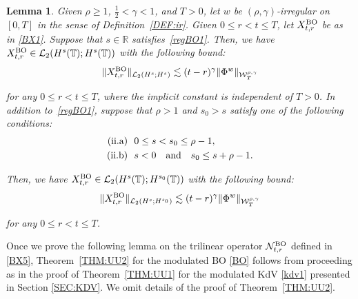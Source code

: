 \documentclass[letterpaper, 11pt,  reqno]{amsart}
\newtheorem{lemma}[theorem]{Lemma}
\newcommand{\1}{\hspace{0.5mm}\text{I}\hspace{0.5mm}}
\newcommand{\noi}{\noindent}
\newcommand{\R}{\mathbb{R}}
\newcommand{\T}{\mathbb{T}}
\renewcommand{\L}{\mathcal{L}}
\newcommand{\g}{\gamma}
\newcommand{\les}{\lesssim}
\newcommand{\NN}{\mathcal{N}}
\newcommand{\W}{\mathcal{W}}
\newcommand{\BO}{\text{\rm BO} }
\numberwithin{equation}{section}
\numberwithin{theorem}{section}
\begin{document}
\begin{lemma}\label{LEM:nonlin3}
Given $\rho \ge 1$,  $\frac12< \g < 1$, and $T> 0$, 
let  $w$ be $(\rho,\g)$-irregular on $[0, T]$ in the sense of Definition~\ref{DEF:ir}.
Given $0 \le r < t \le T$, let $X^\BO_{t, r}$
be as in \eqref{BX1}.
Suppose that $s \in \R$ satisfies~\eqref{regBO1}.
Then, 
we have $X_{t, r}^\BO \in \L_2(H^s(\T); H^{s}(\T))$
with the following bound\textup{:}
\begin{align*}
 \|X^\BO_{t, r}\|_{\L_2(H^s; H^{s})}
\les 
(t-r)^\g  \|\Phi^w\|_{  \W^{\rho,\g}_T}
\end{align*}

\noi
for any $0 \le r < t \le T$, 
where the implicit constant is independent of $T > 0$.
In addition to~\eqref{regBO1}, suppose that 
$\rho  > 1$ and $s_0 > s$ satisfy
one of the following conditions\textup{:}
\begin{align*}
\textup{(ii.a)} &\ \
0 \le s < s_0 \le \rho - 1,\\
\textup{(ii.b)} &\ \
 s <0
\quad 
\text{and}\quad 
s_0 \le s + \rho - 1.
\end{align*}




\noi
Then, 
we have 
$X^\BO_{t, r} \in \L_2(H^s(\T); H^{s_0}(\T))$
with the following bound\textup{:}
\begin{align*}
 \|X^\BO_{t, r}\|_{\L_2(H^s; H^{s_0})}
\les 
(t- r)^\g  \|\Phi^w\|_{  \W^{\rho,\g}_T}
\end{align*}

\noi
for any $0 \le r < t \le T$.



\end{lemma}



Once we prove the following lemma
on the trilinear operator $\NN_{t, r}^\BO$
defined in \eqref{BX5},
Theorem~\ref{THM:UU2} 
for the modulated BO \eqref{BO} follows
from proceeding as in 
the proof of Theorem~\ref{THM:UU1}
for the modulated KdV \eqref{kdv1}
presented in Section \ref{SEC:KDV}.
We omit details of the proof of 
Theorem~\ref{THM:UU2}.
\end{document}
